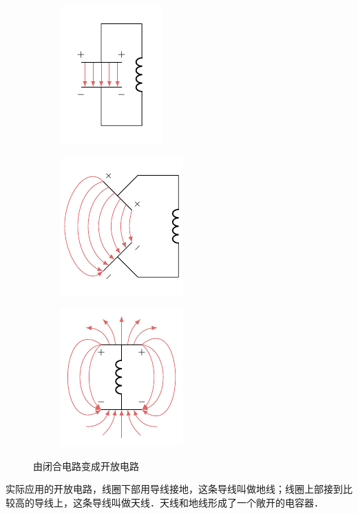 \begin{figure}[htbp]
	\centering
	\begin{subfigure}{0.2\linewidth}
		\centering
		\includegraphics{fig/C/4-11a.pdf}
		\caption{}\label{fig_C_4-11a}
	\end{subfigure}
	\hfil
	\begin{subfigure}{0.33\linewidth}
		\centering
		\includegraphics{fig/C/4-11b.pdf}
		\caption{}\label{fig_C_4-11b}
	\end{subfigure}
	\hfil
	\begin{subfigure}{0.33\linewidth}
		\centering
		\includegraphics{fig/C/4-11c.pdf}
		\caption{}\label{fig_C_4-11c}
	\end{subfigure}
	\caption{由闭合电路变成开放电路}\label{fig_C_4-11}
\end{figure}


实际应用的开放电路，线圈下部用导线接地，这条导线叫做地线；线圈上部接到比较高的导线上，这条导线叫做天线．天线和地线形成了一个敞开的电容器．

